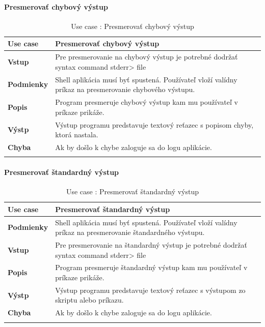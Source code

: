 \paragraph{Presmerovať chybový výstup}
\begin{center}
	\begin{longtable}{|p{2.5cm}|p{14cm}|}
		
			\hline
			\textbf{Use case} & Presmerovať chybový výstup \\ 
			\hline
			\textbf{Vstup} & Pre presmerovanie na chybový výstup je potrebné dodržať syntax command stderr> file\\
			\hline
			\textbf{Podmienky} & Shell aplikácia musí byť spustená. Používateľ vloží valídny príkaz na presmerovanie chybového výstupu. \\ 
			\hline
			\textbf{Popis} & Program presmeruje chybový výstup kam mu používateľ v príkaze prikáže. \\ 
			\hline
			\textbf{Výstp} & Výstup programu predstavuje textový reťazec s popisom chyby, ktorá nastala.\\
			\hline
			\textbf{Chyba} & Ak by došlo k chybe zaloguje sa do logu aplikácie.\\
			\hline
		\caption{Use case : Presmerovať chybový výstup}
		\label{table:1}
		
	\end{longtable}
\end{center}
\paragraph{Presmerovať štandardný výstup}
\begin{center}
	\begin{longtable}{|p{2.5cm}|p{14cm}|}
		
			\hline
			\textbf{Use case} & Presmerovať štandardný výstup \\ 
			\hline
			\textbf{Podmienky} & Shell aplikácia musí byť spustená. Používateľ vloží valídny príkaz na presmerovanie štandardného výstupu. \\ 
			\hline
			\textbf{Vstup} & Pre presmerovanie na štandardný výstup je potrebné dodržať syntax command stderr> file\\
			\hline
			\textbf{Popis} & Program presmeruje štandardný výstup kam mu používateľ v príkaze prikáže.\\ 
			\hline
			\textbf{Výstp} & Výstup programu predstavuje textový reťazec s výstupom zo skriptu alebo príkazu.\\
			\hline
			\textbf{Chyba} & Ak by došlo k chybe zaloguje sa do logu aplikácie.\\
			\hline
		\caption{Use case : Presmerovať štandardný výstup }
		\label{table:1}
		
	\end{longtable}
\end{center}



